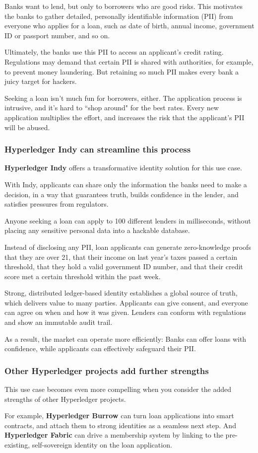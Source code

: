 Banks want to lend, but only to borrowers who are good risks. 
This motivates the banks to gather detailed, personally identifiable information (PII) from everyone who applies for a loan, such as date of birth, annual income, government ID or passport number, and so on. 

Ultimately, the banks use this PII to access an applicant's credit rating. 
Regulations may demand that certain PII is shared with authorities, for example, to prevent money laundering.
But retaining so much PII makes every bank a juicy target for hackers.

Seeking a loan isn't much fun for borrowers, either. 
The application process is intrusive, and it's  hard to ``shop around" for the best rates. 
Every new application multiplies the effort, and increases the risk that the applicant's PII will be abused.

\subsubsection{Hyperledger Indy can streamline this process}
\textbf{Hyperledger Indy} offers a transformative identity solution for this use case. 

With Indy, applicants can share only the information the banks need to make a decision, in a way that guarantees truth, builds confidence in the lender, and satisfies pressures from regulators. 

Anyone seeking a loan can apply to 100 different lenders in milliseconds, without placing any sensitive personal data into a hackable database.

Instead of disclosing any PII, loan applicants can generate zero-knowledge proofs that they are over 21, that their income on last year's taxes passed a certain threshold, that they hold a valid government ID number, and that their credit score met a certain threshold within the past week.

Strong, distributed ledger-based identity establishes a global source of truth, which delivers value to many parties. 
Applicants can give consent, and everyone can agree on when and how it was given.
Lenders can conform with regulations and show an immutable audit trail.

As a result, the market can operate more efficiently: Banks can offer loans with confidence, while applicants can effectively safeguard their PII.

\subsubsection{Other Hyperledger projects add further strengths}
This use case becomes even more compelling when you consider the added strengths of other Hyperledger projects.

For example, \textbf{Hyperledger Burrow} can turn loan applications into smart contracts, and attach them to strong identities as a seamless next step. 
And \textbf{Hyperledger Fabric} can drive a membership system by linking to the pre-existing, self-sovereign identity on the loan application. 
